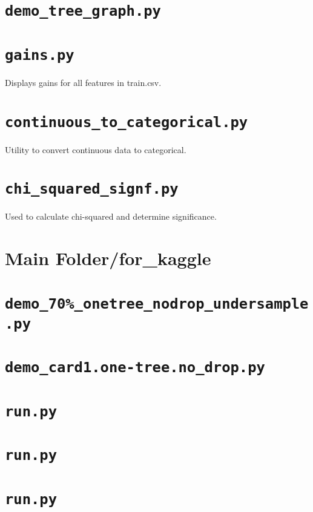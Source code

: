 \documentclass{article}
\begin{document}
\section*{\texttt{demo\_tree\_graph.py}}



\section*{\texttt{gains.py}}
Displays gains for all features in train.csv.

\section*{\texttt{continuous\_to\_categorical.py}}
Utility to convert continuous data to categorical.

\section*{\texttt{chi\_squared\_signf.py}}
Used to calculate chi-squared and determine significance.

\section{\textbf{Main Folder/for\_kaggle}}

\section*{\texttt{demo\_70\%\_onetree\_nodrop\_undersample.py}}






\section*{\texttt{demo\_card1.one-tree.no\_drop.py}}

\section*{\texttt{run.py}}


\section*{\texttt{run.py}}


\section*{\texttt{run.py}}
\end{document}
